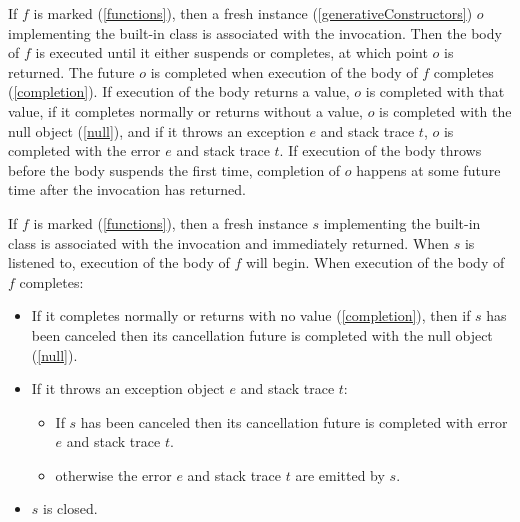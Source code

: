\documentclass{article}
\begin{document}
\LMHash{}
If $f$ is marked \ASYNC{} (\ref{functions}), then a fresh instance (\ref{generativeConstructors}) $o$ implementing the built-in class  is associated with the invocation.
Then the body of $f$ is executed until it either suspends or completes, at which point $o$ is returned.
The future $o$ is completed when execution of the body of $f$ completes (\ref{completion}).
If execution of the body returns a value, $o$ is completed with that value,
if it completes normally or returns without a value,
$o$ is completed with the null object (\ref{null}),
and if it throws an exception $e$ and stack trace $t$,
$o$ is completed with the error $e$ and stack trace $t$.
If execution of the body throws before the body suspends the first time,
completion of $o$ happens at some future time after the invocation has returned.

\LMHash{}
If $f$ is marked \ASYNC* (\ref{functions}), then a fresh instance $s$ implementing the built-in class  is associated with the invocation and immediately returned.
When $s$ is listened to, execution of the body of $f$ will begin.
When execution of the body of $f$ completes:
\begin{itemize}
\item If it completes normally or returns with no value (\ref{completion}), then if $s$ has been canceled then its cancellation future is completed with the null object (\ref{null}).
\item If it throws an exception object $e$ and stack trace $t$:
  \begin{itemize}
  \item If $s$ has been canceled then its cancellation future is completed with error $e$ and stack trace $t$.
  \item otherwise the error $e$ and stack trace $t$ are emitted by $s$.
  \end{itemize}
\item $s$ is closed.
\end{itemize}
\end{document}

